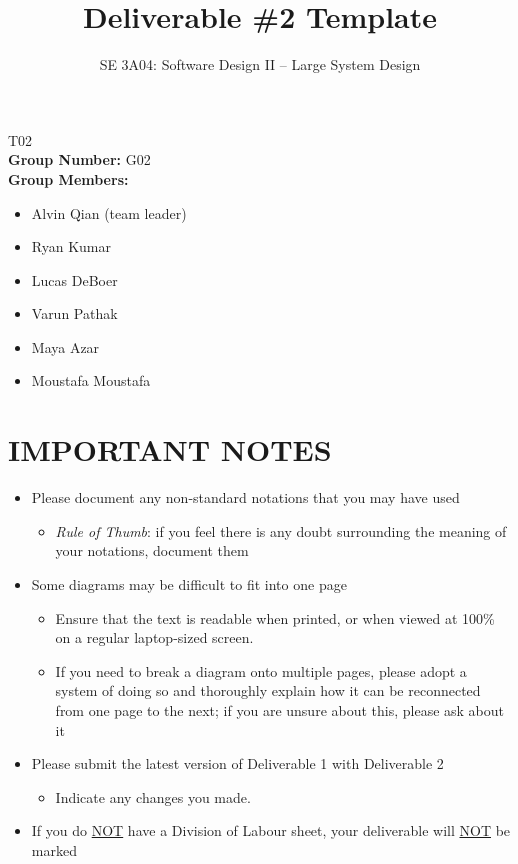 \documentclass[]{article}
\title{Deliverable \#2 Template}
\author{SE 3A04: Software Design II -- Large System Design}
\date{}
\begin{document}
\maketitle	
{} T02\\
{\bf Group Number:} G02 \\
{\bf Group Members:} 
\begin{itemize}
	\item Alvin Qian (team leader)
	\item Ryan Kumar
	\item Lucas DeBoer
	\item Varun Pathak
	\item Maya Azar
	\item Moustafa Moustafa
\end{itemize}

\section*{IMPORTANT NOTES}
\begin{itemize}
	\item Please document any non-standard notations that you may have used
	\begin{itemize}
		\item \emph{Rule of Thumb}: if you feel there is any doubt surrounding the meaning of your notations, document them
	\end{itemize}
	\item Some diagrams may be difficult to fit into one page
	\begin{itemize}
		\item Ensure that the text is readable when printed, or when viewed at 100\% on a regular laptop-sized screen.
		\item If you need to break a diagram onto multiple pages, please adopt a system of doing so and thoroughly explain how it can be reconnected from one page to the next; if you are unsure about this, please ask about it
	\end{itemize}
	\item Please submit the latest version of Deliverable 1 with Deliverable 2
	\begin{itemize}
		\item Indicate any changes you made.
	\end{itemize}
	\item If you do \underline{NOT} have a Division of Labour sheet, your deliverable will \underline{NOT} be marked
\end{itemize}
\end{document}
